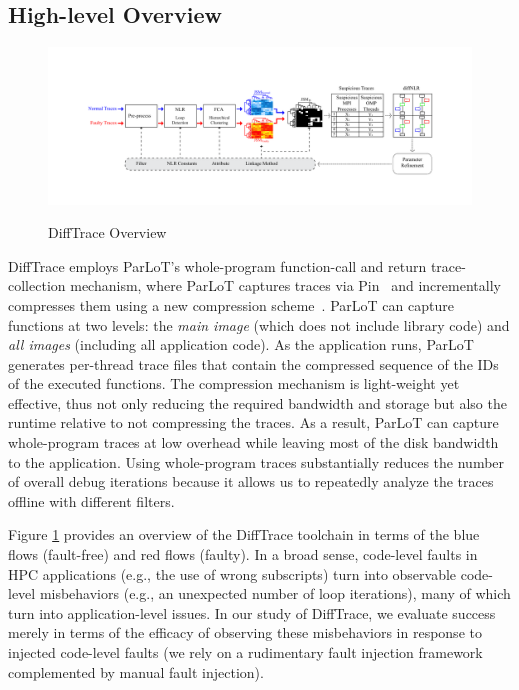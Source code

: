 \subsection{High-level Overview}

\begin{figure}[]
\caption{DiffTrace Overview}
\includegraphics[width=1\textwidth]{figs/overview3.pdf}
\label{fig.diffTraceOverview}
\end{figure}

DiffTrace employs ParLoT's whole-program function-call and return trace-collection mechanism, where ParLoT captures traces via Pin~\cite{pin} and incrementally compresses them using a new compression scheme~\cite{parlot}.
%
ParLoT can capture functions at two levels:
the \textit{main image} (which does not include library code)
and \textit{all images} (including all application code).
%
As the application runs,
ParLoT generates per-thread trace files that
contain the compressed sequence of the IDs of the executed functions.
%
The compression mechanism is light-weight yet effective,
thus not only reducing the required bandwidth and storage but also the
runtime relative to not compressing the traces.
As a result, ParLoT can capture whole-program traces at low overhead
while leaving most of the disk bandwidth to the application. 
%
Using whole-program traces substantially reduces the number of overall
debug iterations because it allows us to repeatedly analyze the
traces offline with different filters.


Figure \ref{fig.diffTraceOverview} provides an overview
of the DiffTrace toolchain
in terms of the blue flows (fault-free) and red flows
(faulty).
%
In a broad sense,
code-level faults in HPC applications (e.g.,
the use of wrong subscripts) turn into observable code-level
misbehaviors
(e.g., an unexpected number of loop iterations), many of which
turn into application-level issues.
%
In our study of DiffTrace, we evaluate
success merely in terms of the efficacy of observing
these misbehaviors in response to injected code-level
faults (we rely on a rudimentary fault injection framework
complemented by manual fault injection).

